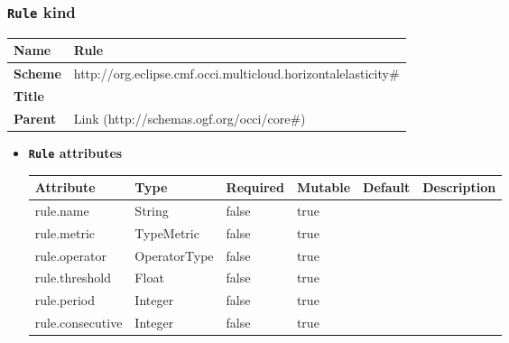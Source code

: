 \subsubsection{\texttt{Rule} kind}
\begin{center}
\begin{tabular}{|l|l|}
  \hline
  \textbf{Name} & Rule \\
  \hline  
  \textbf{Scheme} & http://org.eclipse.cmf.occi.multicloud.horizontalelasticity\# \\
  \hline
  \textbf{Title} &  \\
  \hline
  \textbf{Parent} & Link (http://schemas.ogf.org/occi/core\#) \\
  \hline
\end{tabular}
\end{center}
\begin{itemize}
\item \textbf{\texttt{Rule} attributes}

\begin{tabularx}{\textwidth}{|l|l|p{1.4cm}|p{1.3cm}|l|X|}
  \hline
  \textbf{Attribute} & \textbf{Type} & \textbf{Required} & \textbf{Mutable} & \textbf{Default} & \textbf{Description} \\
  \hline  
  rule.name & String & false & true &  &  \\
  \hline
  rule.metric & TypeMetric & false & true &  &  \\
  \hline
  rule.operator & OperatorType & false & true &  &  \\
  \hline
  rule.threshold & Float & false & true &  &  \\
  \hline
  rule.period & Integer & false & true &  &  \\
  \hline
  rule.consecutive & Integer & false & true &  &  \\
  \hline
\end{tabularx}
\end{itemize}



